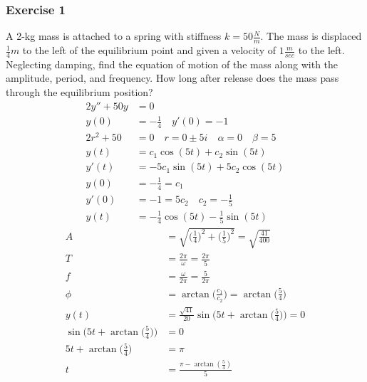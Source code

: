 \documentclass{math}
\begin{document}
\subsubsection*{Exercise 1}
A 2-kg mass is attached to a spring with stiffness \( k = 50\frac{N}{m} \). The
mass is displaced \( \frac{1}{4}m \) to the left of the equilibrium point and
given a velocity of \( 1\frac{m}{sec} \) to the left. Neglecting damping, find
the equation of motion of the mass along with the amplitude, period, and
frequency. How long after release does the mass pass through the equilibrium
position?
\begin{align*}
  2y''+50y &= 0 \\
  y(0) &= -\frac{1}{4} \quad y'(0) = -1 \\
  2r^2+50 &= 0 \quad r = 0\pm5i \quad \alpha = 0 \quad \beta = 5 \\
  y(t) &= c_1\cos(5t)+c_2\sin(5t) \\
  y'(t) &= -5c_1\sin(5t)+5c_2\cos(5t) \\
  y(0) &= -\frac{1}{4} = c_1 \\
  y'(0) &= -1 = 5c_2 \quad c_2 = -\frac{1}{5} \\
  y(t) &= -\frac{1}{4}\cos(5t)-\frac{1}{5}\sin(5t)
\end{align*}
\begin{align*}
  A &= \sqrt{\bigg(\frac{1}{4}\bigg)^2+\bigg(\frac{1}{5}\bigg)^2} =
    \sqrt{\frac{41}{400}} \\
  T &= \frac{2\pi}{\omega} = \frac{2\pi}{5} \\
  f &= \frac{\omega}{2\pi} = \frac{5}{2\pi} \\
  \phi &= \arctan\bigg(\frac{c_1}{c_2}\bigg) = \arctan\bigg(\frac{5}{4}\bigg) \\
  y(t) &= \frac{\sqrt{41}}{20}\sin\bigg(5t+
    \arctan\bigg(\frac{5}{4}\bigg)\bigg) = 0 \\
  \sin\bigg(5t+\arctan\bigg(\frac{5}{4}\bigg)\bigg) &= 0 \\
  5t+\arctan\bigg(\frac{5}{4}\bigg) &= \pi \\
  t &= \frac{\pi-\arctan(\frac{5}{4})}{5}
\end{align*}
\end{document}

